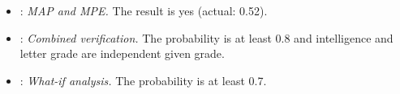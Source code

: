 \begingroup\footnotesize\raggedright
\begin{itemize}[nosep,leftmargin=*]
\item {}: \emph{MAP and MPE.}  The result is yes (actual: 0.52).
\item {}: \emph{Combined verification.}  The probability is at least 0.8 and intelligence and letter grade are independent given grade.
\item {}: \emph{What-if analysis.}  The probability is at least 0.7.
\end{itemize}
\endgroup

